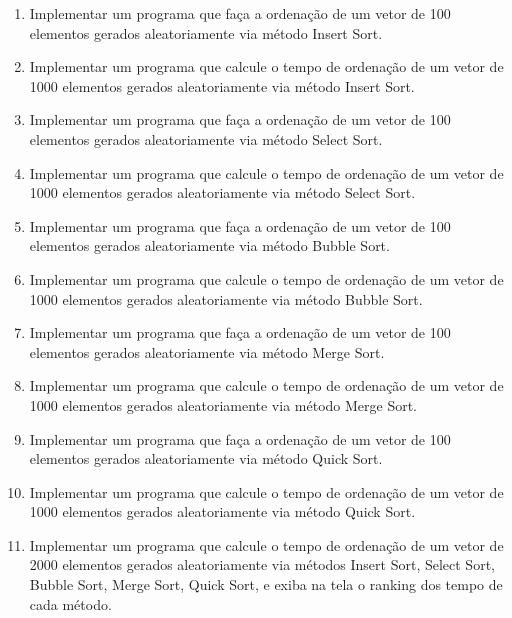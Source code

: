 \documentclass[11pt]{article}
\begin{document}
\begin{enumerate}

\item Implementar um programa que faça a ordenação de um vetor de 100 elementos gerados aleatoriamente via método Insert Sort.

\item Implementar um programa que calcule o tempo de ordenação de um vetor de 1000 elementos gerados aleatoriamente via método Insert Sort.

\item Implementar um programa que faça a ordenação de um vetor de 100 elementos gerados aleatoriamente via método Select Sort.

\item Implementar um programa que calcule o tempo de ordenação de um vetor de 1000 elementos gerados aleatoriamente via método Select Sort.

\item Implementar um programa que faça a ordenação de um vetor de 100 elementos gerados aleatoriamente via método Bubble Sort.

\item Implementar um programa que calcule o tempo de ordenação de um vetor de 1000 elementos gerados aleatoriamente via método Bubble Sort.

\item Implementar um programa que faça a ordenação de um vetor de 100 elementos gerados aleatoriamente via método Merge Sort.

\item Implementar um programa que calcule o tempo de ordenação de um vetor de 1000 elementos gerados aleatoriamente via método Merge Sort.

\item Implementar um programa que faça a ordenação de um vetor de 100 elementos gerados aleatoriamente via método Quick Sort.

\item Implementar um programa que calcule o tempo de ordenação de um vetor de 1000 elementos gerados aleatoriamente via método Quick Sort.

\item Implementar um programa que calcule o tempo de ordenação de um vetor de 2000 elementos gerados aleatoriamente via métodos Insert Sort, Select Sort, Bubble Sort, Merge Sort, Quick Sort, e exiba na tela o ranking dos tempo de cada método.

\end{enumerate}
\end{document}
